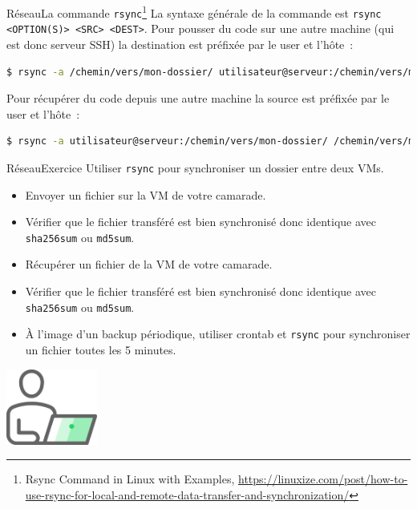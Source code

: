 \documentclass{beamer}
\begin{document}
    \begin{frame}[fragile]{Réseau}{La commande \lstinline{rsync}\footnote{Rsync Command in Linux with Examples, \url{https://linuxize.com/post/how-to-use-rsync-for-local-and-remote-data-transfer-and-synchronization/}}}
        La syntaxe générale de la commande est \lstinline{rsync <OPTION(S)> <SRC> <DEST>}.
        Pour pousser du code sur une autre machine (qui est donc serveur SSH) la destination est préfixée par le user et l'hôte~:
        \bigbreak
        \begin{lstlisting}[language=bash]
$ rsync -a /chemin/vers/mon-dossier/ utilisateur@serveur:/chemin/vers/mon-dossier/
        \end{lstlisting}
        Pour récupérer du code depuis une autre machine la source est préfixée par le user et l'hôte~:
        \begin{lstlisting}[language=bash]
$ rsync -a utilisateur@serveur:/chemin/vers/mon-dossier/ /chemin/vers/mon-dossier/
        \end{lstlisting}
    \end{frame}
    \begin{frame}{Réseau}{Exercice \execcounterdispinc}
        Utiliser \lstinline{rsync} pour synchroniser un dossier entre deux VMs.
        \begin{itemize}
            \item Envoyer un fichier sur la VM de votre camarade.
            \item Vérifier que le fichier transféré est bien synchronisé donc identique avec \lstinline{sha256sum} ou \lstinline{md5sum}.
            \item Récupérer un fichier de la VM de votre camarade.
            \item Vérifier que le fichier transféré est bien synchronisé donc identique avec \lstinline{sha256sum} ou \lstinline{md5sum}.
            \item À l'image d'un backup périodique, utiliser crontab et \lstinline{rsync} pour synchroniser un fichier toutes les 5 minutes.
        \end{itemize}
        \begin{center}
            \includegraphics[width=3cm]{image/guy-in-front-of-desktop}
        \end{center}
    \end{frame}
\end{document}
